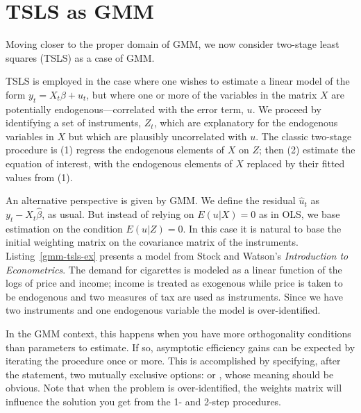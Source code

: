 \section{TSLS as GMM}
\label{sec:gmm-tsls}

Moving closer to the proper domain of GMM, we now consider two-stage
least squares (TSLS) as a case of GMM.  

TSLS is employed in the case where one wishes to estimate a linear
model of the form $y_t = X_t \beta + u_t$, but where one or more of
the variables in the matrix $X$ are potentially
endogenous---correlated with the error term, $u$.  We proceed by
identifying a set of instruments, $Z_t$, which are explanatory for the
endogenous variables in $X$ but which are plausibly uncorrelated with
$u$.  The classic two-stage procedure is (1) regress the endogenous
elements of $X$ on $Z$; then (2) estimate the equation of interest,
with the endogenous elements of $X$ replaced by their fitted values
from (1).

An alternative perspective is given by GMM.  We define the residual
$\hat{u}_t$ as $y_t - X_t \hat{\beta}$, as usual.  But instead of
relying on $E(u|X) = 0$ as in OLS, we base estimation on the condition
$E(u|Z) = 0$.  In this case it is natural to base the initial
weighting matrix on the covariance matrix of the instruments.
Listing~\ref{gmm-tsls-ex} presents a model from Stock and Watson's
\textit{Introduction to Econometrics}.  The demand for cigarettes is
modeled as a linear function of the logs of price and income; income
is treated as exogenous while price is taken to be endogenous and two
measures of tax are used as instruments.  Since we have two
instruments and one endogenous variable the model is over-identified.

In the GMM context, this happens when you have more orthogonality
conditions than parameters to estimate. If so, asymptotic efficiency
gains can be expected by iterating the procedure once or more. This is
accomplished by specifying, after the  statement, two
mutually exclusive options:  or ,
whose meaning should be obvious.  Note that when the problem is
over-identified, the weights matrix will influence the solution you
get from the 1- and 2-step procedures.




